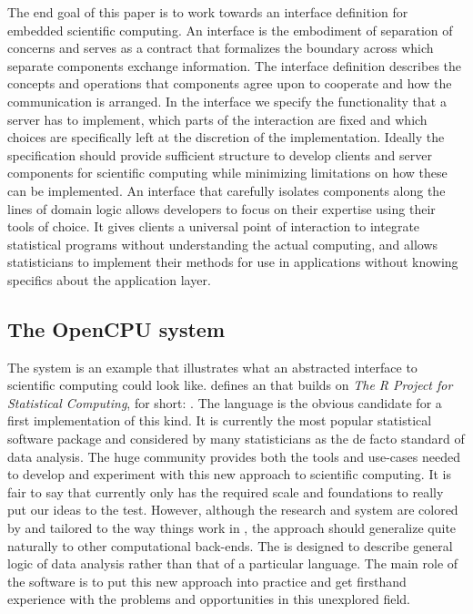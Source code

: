 The end goal of this paper is to work towards an interface definition for embedded scientific computing. An interface is the embodiment of separation of concerns and serves as a contract that formalizes the boundary across which separate components exchange information. The interface definition describes the concepts and operations that components agree upon to cooperate and how the communication is arranged. In the interface we specify the functionality that a server has to implement, which parts of the interaction are fixed and which choices are specifically left at the discretion of the implementation. Ideally the specification should provide sufficient structure to develop clients and server components for scientific computing while minimizing limitations on how these can be implemented. An interface that carefully isolates components along the lines of domain logic allows developers to focus on their expertise using their tools of choice. It gives clients a universal point of interaction to integrate statistical programs without understanding the actual computing, and allows statisticians to implement their methods for use in applications without knowing specifics about the application layer.


\subsection{The OpenCPU system}

The \OpenCPU system is an example that illustrates what an abstracted interface to scientific computing could look like. \OpenCPU defines an \HTTP \API that builds on \emph{The R Project for Statistical Computing}, for short: \R \citep{R}. The \R language is the obvious candidate for a first implementation of this kind. It is currently the most popular statistical software package and considered by many statisticians as the de facto standard of data analysis. The huge \R community provides both the tools and use-cases needed to develop and experiment with this new approach to scientific computing. It is fair to say that currently only \R has the required scale and foundations to really put our ideas to the test. However, although the research and \OpenCPU system are colored by and tailored to the way things work in \R, the approach should generalize quite naturally to other computational back-ends. The \API is designed to describe general logic of data analysis rather than that of a particular language. The main role of the software is to put this new approach into practice and get firsthand experience with the problems and opportunities in this unexplored field. 

